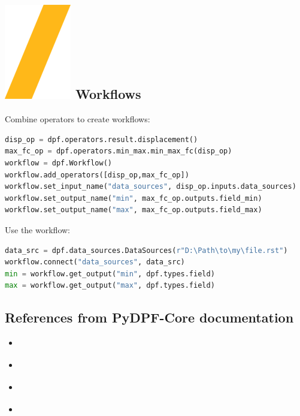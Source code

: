\documentclass[9pt,landscape]{article}
\begin{document}
\begin{multicols}{3}
\section{\includegraphics[height=\fontcharht\font`\S]{slash.png} Workflows}
Combine operators to create workflows:
\begin{lstlisting}[language=Python]
disp_op = dpf.operators.result.displacement()
max_fc_op = dpf.operators.min_max.min_max_fc(disp_op)
workflow = dpf.Workflow()
workflow.add_operators([disp_op,max_fc_op])
workflow.set_input_name("data_sources", disp_op.inputs.data_sources)
workflow.set_output_name("min", max_fc_op.outputs.field_min)
workflow.set_output_name("max", max_fc_op.outputs.field_max)
\end{lstlisting}

Use the workflow:
\begin{lstlisting}[language=Python]
data_src = dpf.data_sources.DataSources(r"D:\Path\to\my\file.rst")
workflow.connect("data_sources", data_src)
min = workflow.get_output("min", dpf.types.field)
max = workflow.get_output("max", dpf.types.field)
\end{lstlisting}



\subsection{References from PyDPF-Core documentation}
\begin{itemize}
\item \href{https://dpf.docs.pyansys.com/version/stable/getting_started/index.html}{\color{blue}{Getting started}}
\item \href{https://dpf.docs.pyansys.com/version/stable/examples/index.html}{\color{blue}{Examples}}
\item \href{https://dpf.docs.pyansys.com/version/stable/api/index.html}{\color{blue}{API reference}}
\item \href{https://dpf.docs.pyansys.com/version/stable/operator_reference.html}{\color{blue}{Operators}}
\end{itemize}
\end{multicols}
\end{document}
